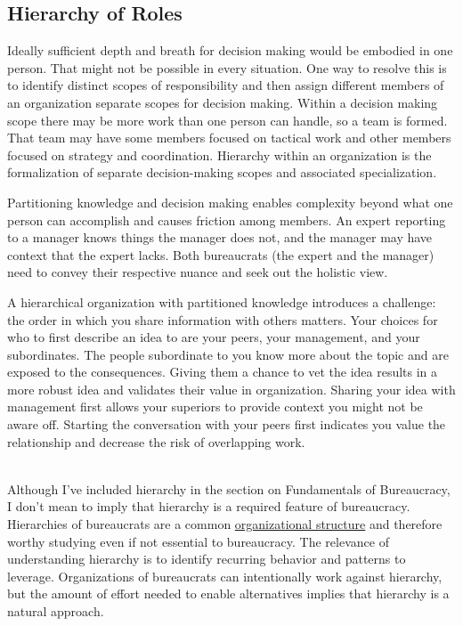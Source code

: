 \subsection{Hierarchy of Roles\label{sec:hierarchy_of_roles}}

Ideally sufficient depth and breath for decision making would be embodied in one person. That might not be possible in every situation. One way to resolve this is to identify distinct scopes of responsibility and then assign different members of an organization separate scopes for decision making. Within a decision making scope there may be more work than one person can handle, so a team is formed. That team may have some members focused on tactical work and other members focused on strategy and coordination. Hierarchy within an organization is the formalization of separate decision-making scopes and associated specialization. 

Partitioning knowledge and decision making enables complexity beyond what one person can accomplish and causes friction among members. An expert reporting to a manager knows things the manager does not, and the manager may have context that the expert lacks. Both bureaucrats (the expert and the manager) need to convey their respective nuance and seek out the holistic view.

A hierarchical organization with partitioned knowledge introduces a challenge: the order in which you share information with others matters. Your choices for who to first describe an idea to are your peers, your management, and your subordinates.  The people subordinate to you know more about the topic and are exposed to the consequences. Giving them a chance to vet the idea results in a more robust idea and validates their value in organization. Sharing your idea with management first allows your superiors to provide context you might not be aware off. Starting the conversation with your peers first indicates you value the relationship and decrease the risk of overlapping work.

\ \\

Although I've included hierarchy in the section on Fundamentals of Bureaucracy, I don't mean to imply that hierarchy is a required feature of bureaucracy. Hierarchies of bureaucrats are a common \href{https://en.wikipedia.org/wiki/Organizational_structure}{organizational structure} and therefore worthy studying even if not essential to bureaucracy. The relevance of understanding hierarchy is to identify recurring behavior and patterns to leverage.
Organizations of bureaucrats can intentionally work against hierarchy, but the amount of effort needed to enable alternatives implies that hierarchy is a natural approach.

